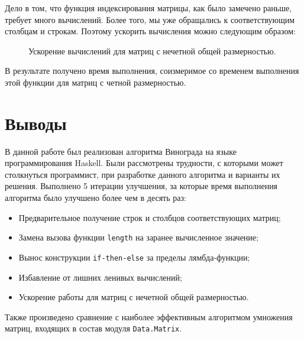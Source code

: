 \documentclass[a4paper,12pt,russian]{article}
\begin{document}
	Дело в том, что функция индексирования матрицы, как было замечено раньше, требует много вычислений. Более того, мы уже обращались к соответствующим столбцам и строкам. Поэтому ускорить вычисления можно следующим образом:	
	
	\begin{figure}[H]
		\caption{Ускорение вычислений для матриц с нечетной общей размерностью.}
		
	\end{figure}
	
	В результате получено время выполнения, соизмеримое со временем выполнения этой функции для матриц с четной размерностью.
	

	\section{Выводы}
	В данной работе был реализован алгоритма Винограда на языке программирования Haskell. Были рассмотрены трудности, с которыми может столкнуться программист, при разработке данного алгоритма и варианты их решения. Выполнено 5 итерации улучшения, за которые время выполнения алгоритма было улучшено более чем в десять раз:
	\begin{itemize}
		\item Предварительное получение строк и столбцов соответствующих матриц;
		\item Замена вызова функции \texttt{length} на заранее вычисленное значение;
		\item Вынос конструкции \texttt{if-then-else} за пределы лямбда-функции;
		\item Избавление от лишних ленивых вычислений;
		\item Ускорение работы для матриц с нечетной общей размерностью.
	\end{itemize} 
	Также произведено сравнение с наиболее эффективным алгоритмом умножения матриц, входящих в состав модуля \texttt{Data.Matrix}. 
	
\end{document}
